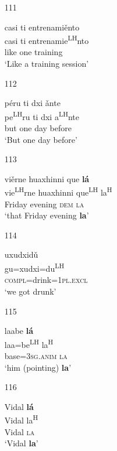 \begin{itemize}
\item[111]
 
\glll   casi ti entrenami\v{e}nto\\
  casi ti entrenamie\textsuperscript{LH}nto\\
  like one training\\
\glt `Like a training session'
 

\item[112]

\glll p\'{e}ru ti dxi \v{a}nte \\
pe\textsuperscript{LH}ru ti dxi a\textsuperscript{LH}nte \\
but one day before \\
\glt  `But one day before'



\item[113]

\glll vi\v{e}rne huaxhinni que \textbf{l\'{a}} \\
vie\textsuperscript{LH}rne huaxhinni que\textsuperscript{LH} la\textsuperscript{H} \\
Friday evening \textsc{dem} \textsc{la} \\
\glt  `that Friday evening \textbf{la}'



\item[114]

\glll uxudxid\v{u} \\
gu=xudxi=du\textsuperscript{LH} \\
\textsc{compl}=drink=1\textsc{pl.excl} \\
\glt  `we got drunk'



\item[115]

\glll laabe \textbf{l\'{a}} \\
laa=be\textsuperscript{LH} la\textsuperscript{H} \\
base=3\textsc{sg.anim} \textsc{la} \\
\glt  `him (pointing) \textbf{la}'



\item[116]

\glll Vidal \textbf{l\'{a}} \\
Vidal la\textsuperscript{H} \\
Vidal \textsc{la} \\
\glt  `Vidal \textbf{la}'




\end{itemize}
